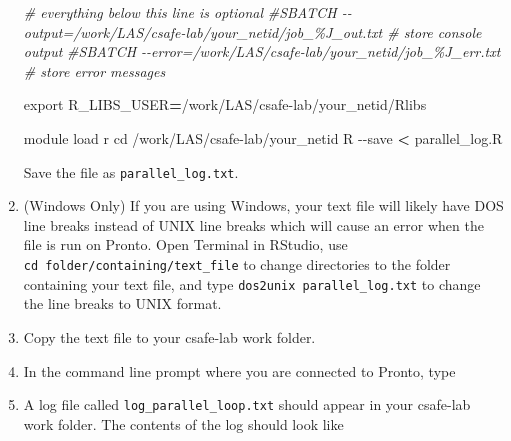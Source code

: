 \documentclass[
]{book}
\newenvironment{Shaded}{\begin{snugshade}}{\end{snugshade}}
\newcommand{\AttributeTok}[1]{\textcolor[rgb]{0.77,0.63,0.00}{#1}}
\newcommand{\BuiltInTok}[1]{#1}
\newcommand{\CommentTok}[1]{\textcolor[rgb]{0.56,0.35,0.01}{\textit{#1}}}
\newcommand{\ExtensionTok}[1]{#1}
\newcommand{\NormalTok}[1]{#1}
\newcommand{\OperatorTok}[1]{\textcolor[rgb]{0.81,0.36,0.00}{\textbf{#1}}}
\newcommand{\VariableTok}[1]{\textcolor[rgb]{0.00,0.00,0.00}{#1}}
\begin{document}
\begin{enumerate}
\begin{Shaded}
\begin{Highlighting}[]
\CommentTok{\# everything below this line is optional}
\CommentTok{\#SBATCH {-}{-}output=/work/LAS/csafe{-}lab/your\_netid/job\_\%J\_out.txt \# store console output}
\CommentTok{\#SBATCH {-}{-}error=/work/LAS/csafe{-}lab/your\_netid/job\_\%J\_err.txt \# store error messages}

\BuiltInTok{export} \VariableTok{R\_LIBS\_USER}\OperatorTok{=}\NormalTok{/work/LAS/csafe{-}lab/your\_netid/Rlibs}

\ExtensionTok{module}\NormalTok{ load r}
\BuiltInTok{cd}\NormalTok{ /work/LAS/csafe{-}lab/your\_netid}
\ExtensionTok{R} \AttributeTok{{-}{-}save} \OperatorTok{\textless{}}\NormalTok{ parallel\_log.R}
\end{Highlighting}
\end{Shaded}

  Save the file as \texttt{parallel\_log.txt}.
\item
  (Windows Only) If you are using Windows, your text file will likely have DOS line breaks instead of UNIX line breaks which will cause an error when the file is run on Pronto. Open Terminal in RStudio, use \texttt{cd\ folder/containing/text\_file} to change directories to the folder containing your text file, and type \texttt{dos2unix\ parallel\_log.txt} to change the line breaks to UNIX format.
\item
  Copy the text file to your csafe-lab work folder.
\item
  In the command line prompt where you are connected to Pronto, type

\begin{Shaded}
\end{Shaded}
\item
  A log file called \texttt{log\_parallel\_loop.txt} should appear in your csafe-lab work folder. The contents of the log should look like


\end{enumerate}
\end{document}
